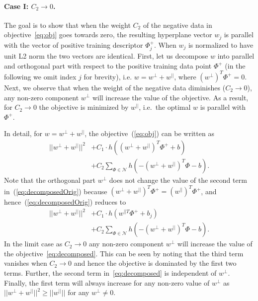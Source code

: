 \documentclass[10pt,twocolumn,letterpaper]{article}
\begin{document}
      \paragraph{Case I: $C_2\rightarrow 0$.}
         The goal is to show that when the weight  $C_2$ of the negative data in objective~\eqref{eq:obj} goes towards zero, the resulting hyperplane vector $w_j$ is parallel with the vector of positive training descriptor $\Phi_j^+$. When $w_j$ is normalized to have unit L2 norm the two vectors are identical. First, let us decompose $w$ into parallel and orthogonal part with respect to the positive training data point $\Phi^+$ (in the following we omit index $j$ for brevity), i.e. $w=w^{\perp}+w^{||}$, where $(w^{\perp})^T \Phi^+ = 0$. Next, we observe that when the weight of the negative data diminishes ($C_2\rightarrow 0$), any non-zero component $w^{\perp}$ will increase the value of the objective. As a result, for $C_2\rightarrow 0$ the objective is minimized by $w^{||}$, i.e.\ the optimal $w$ is parallel with $\Phi^+$.

         In detail, for $w=w^{\perp}+w^{||}$, the objective~(\ref{eq:obj}) can be written as
         \begin{align}
            \label{eq:decomposedOrig}
              ||w^{\perp}+w^{||}||^{2} &+
              C_1 \cdot h
              \left(
               (w^{\perp}+w^{||})^T\Phi^+ + b
              \right) \\ \nonumber
              &+
              C_2\sum_{\Phi\in \mathcal N} h
              \left(
               -(w^{\perp}+w^{||})^T\Phi-b
              \right).
         \end{align}
         Note that the orthogonal part $w^{\perp}$ does not change the value of  the second term in~(\ref{eq:decomposedOrig}) because $(w^{\perp}+w^{||})^T\Phi^+=(w^{||})^T\Phi^+$, and hence~(\ref{eq:decomposedOrig}) reduces to
         \begin{align} 
            \label{eq:decomposed} 
            ||w^{\perp}+w^{||}||^{2} &+
            C_1 \cdot h
            \left(
                w^{||T}\Phi^+ +b_j
            \right) \\ \nonumber
            &+
            C_2\sum_{\Phi\in \mathcal N} h
            \left(
                -(w^{\perp}+w^{||})^T\Phi-b
            \right).
         \end{align}
         In the limit case as $C_2 \rightarrow 0$ any non-zero component $w^{\perp}$
         will increase the value of the objective~\eqref{eq:decomposed}. This can be seen by noting that the third term vanishes when $C_2 \rightarrow 0$ and hence the objective is dominated by the first two terms. Further, the second term in~\eqref{eq:decomposed} is independent of $w^{\perp}$. Finally, the first term will always increase for any non-zero value of $w^{\perp}$ as $||w^{\perp}+w^{||}||^{2} \geq ||w^{||}||$ for any $w^{\perp}\neq0$.
\end{document}
